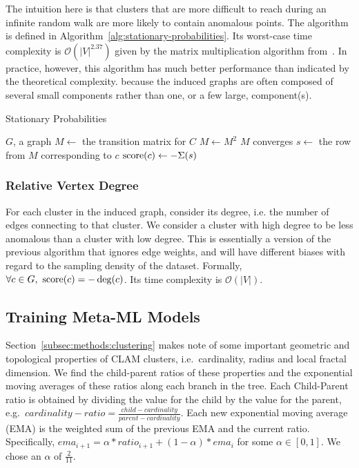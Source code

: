 The intuition here is that clusters that are more difficult to reach during an infinite random walk are more likely to contain anomalous points.
The algorithm is defined in Algorithm~\ref{alg:stationary-probabilities}.
Its worst-case time complexity is $\mathcal{O}(|V|^{2.37})$ given by the matrix multiplication algorithm from~\cite{alman2021refined}.
In practice, however, this algorithm has much better performance than indicated by the theoretical complexity. because the induced graphs are often composed of several small components rather than one, or a few large, component(s).

\begin{algorithm}[h]
    \caption{Stationary Probabilities}
    \label{alg:stationary-probabilities}
\begin{algorithmic}[1]
    \REQUIRE $G$, a graph
        \STATE $M \gets$ the transition matrix for $C$
        \REPEAT
            \STATE $M \gets M^2$
        \UNTIL $M$ converges
            \STATE $s \gets $ the row from $M$ corresponding to $c$
            \STATE $\operatorname{score}(c) \gets -\Sigma(s)$ 
        \ENDFOR
    \ENDFOR
\end{algorithmic}
\end{algorithm}


\subsubsection{Relative Vertex Degree}
\label{subsubsec:methods:individual-algorithms:relative-vertex-degree}
For each cluster in the induced graph, consider its degree, i.e. the number of edges connecting to that cluster.
We consider a cluster with high degree to be less anomalous than a cluster with low degree.
This is essentially a version of the previous algorithm that ignores edge weights, and will have different biases with regard to the sampling density of the dataset.
Formally, $\forall c \in G, \ \operatorname{score}(c) = -\deg(c)$.
Its time complexity is $\mathcal{O}(|V|)$.


\subsection{Training Meta-ML Models}
\label{subsec:methods:training-meta-ml-models}

Section~\ref{subsec:methods:clustering} makes note of some important geometric and topological properties of CLAM clusters, i.e.\ cardinality, radius and local fractal dimension.
We find the child-parent ratios of these properties and the exponential moving averages of these ratios along each branch in the tree.
Each Child-Parent ratio is obtained by dividing the value for the child by the value for the parent, e.g.\ $cardinality-ratio = \frac{child-cardinality}{parent-cardinality}$.
Each new exponential moving average (EMA) is the weighted sum of the previous EMA and the current ratio.
Specifically, $ema_{i+1} = \alpha * ratio_{i + 1} + (1 - \alpha) * ema_i$ for some $\alpha \in [0, 1]$.
We chose an $\alpha$ of $\frac{2}{11}$.

